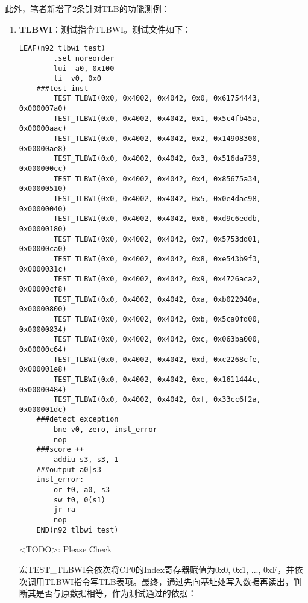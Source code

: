 此外，笔者新增了2条针对TLB的功能测例：

\begin{enumerate}
    \item {\bf TLBWI}：测试指令TLBWI。测试文件如下：

    \begin{lstlisting}[caption={n92\_tlbwi.S}, emph={TEST\_TLBWI}]
    LEAF(n92_tlbwi_test)
        .set noreorder
        lui  a0, 0x100
        li  v0, 0x0
    ###test inst
        TEST_TLBWI(0x0, 0x4002, 0x4042, 0x0, 0x61754443, 0x000007a0)
        TEST_TLBWI(0x0, 0x4002, 0x4042, 0x1, 0x5c4fb45a, 0x00000aac)
        TEST_TLBWI(0x0, 0x4002, 0x4042, 0x2, 0x14908300, 0x00000ae8)
        TEST_TLBWI(0x0, 0x4002, 0x4042, 0x3, 0x516da739, 0x000000cc)
        TEST_TLBWI(0x0, 0x4002, 0x4042, 0x4, 0x85675a34, 0x00000510)
        TEST_TLBWI(0x0, 0x4002, 0x4042, 0x5, 0x0e4dac98, 0x00000040)
        TEST_TLBWI(0x0, 0x4002, 0x4042, 0x6, 0xd9c6eddb, 0x00000180)
        TEST_TLBWI(0x0, 0x4002, 0x4042, 0x7, 0x5753dd01, 0x00000ca0)
        TEST_TLBWI(0x0, 0x4002, 0x4042, 0x8, 0xe543b9f3, 0x0000031c)
        TEST_TLBWI(0x0, 0x4002, 0x4042, 0x9, 0x4726aca2, 0x00000cf8)
        TEST_TLBWI(0x0, 0x4002, 0x4042, 0xa, 0xb022040a, 0x00000800)
        TEST_TLBWI(0x0, 0x4002, 0x4042, 0xb, 0x5ca0fd00, 0x00000834)
        TEST_TLBWI(0x0, 0x4002, 0x4042, 0xc, 0x063ba000, 0x00000c64)
        TEST_TLBWI(0x0, 0x4002, 0x4042, 0xd, 0xc2268cfe, 0x000001e8)
        TEST_TLBWI(0x0, 0x4002, 0x4042, 0xe, 0x1611444c, 0x00000484)
        TEST_TLBWI(0x0, 0x4002, 0x4042, 0xf, 0x33cc6f2a, 0x000001dc)
    ###detect exception
        bne v0, zero, inst_error
        nop
    ###score ++
        addiu s3, s3, 1
    ###output a0|s3
    inst_error:
        or t0, a0, s3
        sw t0, 0(s1)
        jr ra
        nop
    END(n92_tlbwi_test)
    \end{lstlisting}

    <TODO>: Please Check
    
    宏TEST\_TLBWI会依次将CP0的Index寄存器赋值为0x0, 0x1, ..., 0xF，并依次调用TLBWI指令写TLB表项。最终，通过先向基址处写入数据再读出，判断其是否与原数据相等，作为测试通过的依据：


\end{enumerate}
